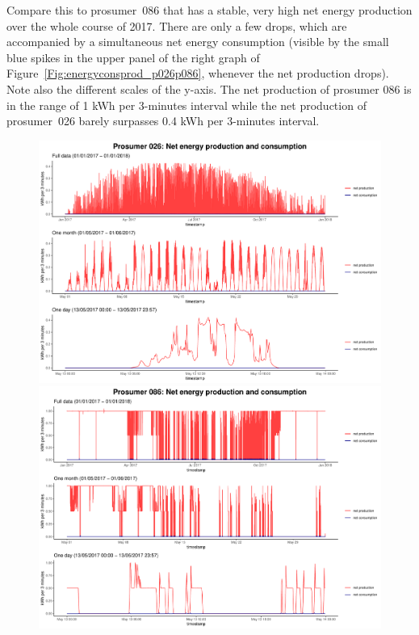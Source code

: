 Compare this to prosumer~086 that has a stable, very high net energy production over the whole course of 2017. There are only a few drops, which are accompanied by a simultaneous net energy consumption (visible by the small blue spikes in the upper panel of the right graph of Figure~\ref{Fig:energyconsprod_p026p086}, whenever the net production drops). Note also the different scales of the y-axis. The net production of prosumer 086 is in the range of 1 kWh per 3-minutes interval while the net production of prosumer~026 barely surpasses 0.4 kWh per 3-minutes interval.
%
\begin{figure}
\centering
\begin{minipage}[h]{\dimexpr.5\textwidth-0.15em}
\includegraphics[width=\textwidth]{thesis/graphs/timeseries/p026_prod&cons.pdf}
\end{minipage}
\begin{minipage}[h]{\dimexpr.5\textheight-0.15em}
\includegraphics[width=\textwidth]{thesis/graphs/timeseries/p086_prod&cons.pdf}
\end{minipage}


\end{figure}
